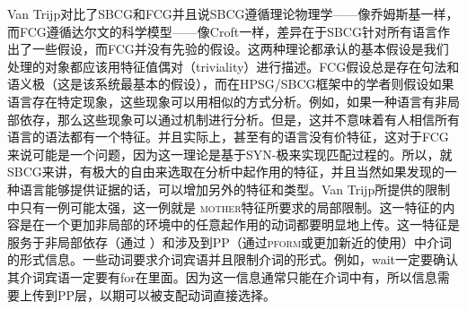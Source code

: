 Van Trijp对比了SBCG和FCG并且说SBCG遵循理论物理学——像乔姆斯基一样，而FCG遵循达尔文的科学模型——像Croft一样，差异在于SBCG针对所有语言作出了一些假设，而FCG并没有先验的假设。这两种理论都承认的基本假设是我们处理的对象都应该用特征值偶对（triviality）进行描述。FCG假设总是存在句法和语义极（这是该系统最基本的假设），而在HPSG/SBCG框架中的学者则假设如果语言存在特定现象，这些现象可以用相似的方式分析。例如，如果一种语言有非局部依存，那么这些现象可以通过\slaschc 机制进行分析。但是，这并不意味着有人相信所有语言的语法都有一个\slaschc 特征。并且实际上，甚至有的语言没有价特征\citep{KM2010a-u}，这对于FCG来说可能是一个问题，因为这一理论是基于SYN-极来实现匹配过程的。所以，就SBCG来讲，有极大的自由来选取在分析中起作用的特征，并且当然如果发现的一种语言能够提供证据的话，可以增加另外的特征和类型。Van Trijp所提供的限制中只有一例可能太强，这一例就是 \textsc{mother}特征所要求的局部限制。这一特征的内容是在一个更加非局部的环境中的任意起作用的动词都要明显地上传。这一特征是服务于非局部依存（通过 \slaschc）和涉及到PP（通过\textsc{pform}或更加新近的使用\formc）中介词的形式信息。一些动词要求介词宾语并且限制介词的形式。例如，wait一定要确认其介词宾语一定要有for在里面。因为这一信息通常只能在介词中有，所以信息需要上传到PP层，以期可以被支配动词直接选择。
